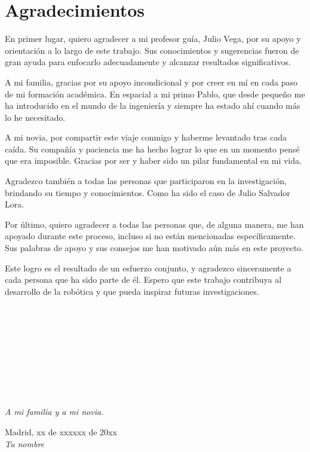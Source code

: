 \cleardoublepage

\chapter*{Agradecimientos}

\noindent En primer lugar, quiero agradecer a mi profesor guía, Julio Vega, por su apoyo y orientación a lo largo de este trabajo. Sus conocimientos y 
sugerencias fueron de gran ayuda para enfocarlo adecuadamente y alcanzar resultados significativos.

A mi familia, gracias por su apoyo incondicional y por creer en mí en cada paso de mi formación académica. En espacial a mi primo Pablo, que desde 
pequeño me ha introducido en el mundo de la ingeniería y siempre ha estado ahí cuando más lo he necesitado.

A mi novia, por compartir este viaje conmigo y haberme levantado tras cada caída. Su compañía y paciencia me ha hecho lograr lo que en un momento pensé 
que era imposible. Gracias por ser y haber sido un pilar fundamental en mi vida.

Agradezco también a todas las personas que participaron en la investigación, brindando su tiempo y conocimientos. Como ha sido el caso de Julio Salvador 
Lora.

Por último, quiero agradecer a todas las personas que, de alguna manera, me han apoyado durante este proceso, incluso si no están mencionadas 
específicamente. Sus palabras de apoyo y sus consejos me han motivado aún más en este proyecto.

Este logro es el resultado de un esfuerzo conjunto, y agradezco sinceramente a cada persona que ha sido parte de él. Espero que este 
trabajo contribuya al desarrollo de la robótica y que pueda inspirar futuras investigaciones.

\ %

\

\

\

\

\begin{flushright}
		\vspace{4.0 cm}
		\emph{A mi familia y a mi novia.}\\
		\par
		\vspace{1.0 cm}
		Madrid, xx de xxxxxx de 20xx\\ %
		\emph{Tu nombre}
\end{flushright}

\thispagestyle{empty}

